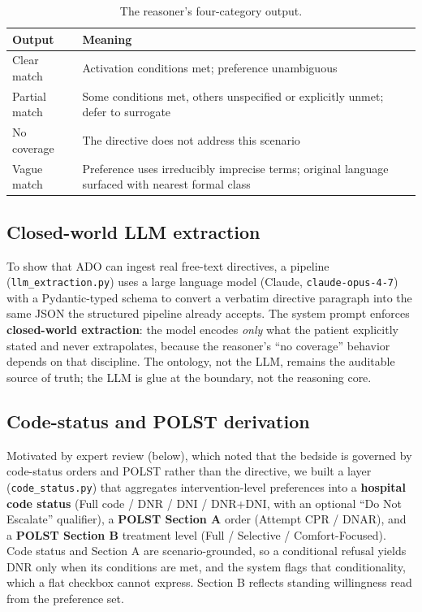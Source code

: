 \documentclass[10pt]{article}
\begin{document}
\begin{table}[ht]
\centering
\caption{The reasoner's four-category output.}
\label{tab:outputs}
\small
\begin{tabularx}{0.95\textwidth}{lX}
\toprule
\textbf{Output} & \textbf{Meaning} \\
\midrule
Clear match & Activation conditions met; preference unambiguous \\
Partial match & Some conditions met, others unspecified or explicitly unmet; defer to surrogate \\
No coverage & The directive does not address this scenario \\
Vague match & Preference uses irreducibly imprecise terms; original language surfaced with nearest formal class \\
\bottomrule
\end{tabularx}
\end{table}

\subsection{Closed-world LLM extraction}
To show that ADO can ingest real free-text directives, a pipeline (\texttt{llm\_extraction.py}) uses a large language model (Claude, \texttt{claude-opus-4-7}) with a Pydantic-typed schema to convert a verbatim directive paragraph into the same JSON the structured pipeline already accepts. The system prompt enforces \textbf{closed-world extraction}: the model encodes \emph{only} what the patient explicitly stated and never extrapolates, because the reasoner's ``no coverage'' behavior depends on that discipline. The ontology, not the LLM, remains the auditable source of truth; the LLM is glue at the boundary, not the reasoning core.

\subsection{Code-status and POLST derivation}
Motivated by expert review (below), which noted that the bedside is governed by code-status orders and POLST rather than the directive, we built a layer (\texttt{code\_status.py}) that aggregates intervention-level preferences into a \textbf{hospital code status} (Full code / DNR / DNI / DNR+DNI, with an optional ``Do Not Escalate'' qualifier), a \textbf{POLST Section A} order (Attempt CPR / DNAR), and a \textbf{POLST Section B} treatment level (Full / Selective / Comfort-Focused). Code status and Section A are scenario-grounded, so a conditional refusal yields DNR only when its conditions are met, and the system flags that conditionality, which a flat checkbox cannot express. Section B reflects standing willingness read from the preference set.
\end{document}
